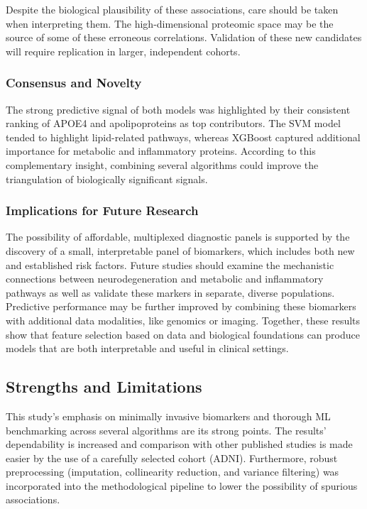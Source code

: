 \documentclass[a4paper,12pt]{article}
\begin{document}
Despite the biological plausibility of these associations, care should be taken when interpreting them.  The high-dimensional proteomic space may be the source of some of these erroneous correlations.  Validation of these new candidates will require replication in larger, independent cohorts.

\subsubsection{Consensus and Novelty}

The strong predictive signal of both models was highlighted by their consistent ranking of APOE4 and apolipoproteins as top contributors.  The SVM model tended to highlight lipid-related pathways, whereas XGBoost captured additional importance for metabolic and inflammatory proteins.  According to this complementary insight, combining several algorithms could improve the triangulation of biologically significant signals.

\subsubsection{Implications for Future Research}

The possibility of affordable, multiplexed diagnostic panels is supported by the discovery of a small, interpretable panel of biomarkers, which includes both new and established risk factors.  Future studies should examine the mechanistic connections between neurodegeneration and metabolic and inflammatory pathways as well as validate these markers in separate, diverse populations.  Predictive performance may be further improved by combining these biomarkers with additional data modalities, like genomics or imaging.  Together, these results show that feature selection based on data and biological foundations can produce models that are both interpretable and useful in clinical settings.


\subsection{Strengths and Limitations}
This study's emphasis on minimally invasive biomarkers and thorough ML benchmarking across several algorithms are its strong points.  The results' dependability is increased and comparison with other published studies is made easier by the use of a carefully selected cohort (ADNI).  Furthermore, robust preprocessing (imputation, collinearity reduction, and variance filtering) was incorporated into the methodological pipeline to lower the possibility of spurious associations.
\end{document}

